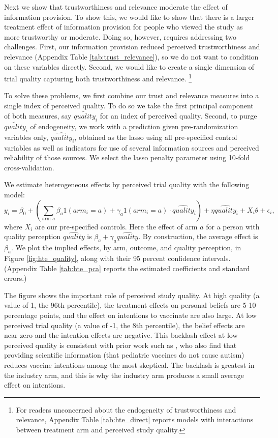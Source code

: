 Next we show that trustworthiness and relevance moderate the effect of information provision. To show this, we would like to show that there is a larger treatment effect of information provision for people who viewed the study as more trustworthy or moderate. Doing so, however, requires addressing two challenges. First, our information provision reduced perceived trustworthiness and relevance (Appendix Table \ref{tab:trust_relevance}), so we do not want to condition on these variables directly. Second, we would like to create a single dimension of trial quality capturing both trustworthiness and relevance.%
\footnote{For readers unconcerned about the endogeneity of trustworthiness and relevance, Appendix Table \ref{tab:hte_direct} reports models with interactions between treatment arm and perceived study quality.}

To solve these problems, we first combine our trust and relevance measures into a single index of perceived quality. To do so we take the first principal component of both measures, say
$\widetilde{quality}_i$ for an index of perceived quality. Second, to purge 
$\widetilde{quality}_i$ of endogeneity, we work with a prediction given pre-randomization
variables only, $\widehat{quality}_i$, obtained as the lasso using all pre-specified
control variables as well as indicators for use of several information sources and
perceived reliability of those sources. We select the lasso penalty parameter using 
10-fold cross-validation. 

We estimate heterogeneous effects by perceived trial quality with the following model:
\begin{equation} \label{eq:hte_quality}
  y_i = \beta_0 + \left(
    \sum_{\text{arm } a} \beta_a 1(arm_i=a) + \gamma_a 1(arm_i=a)\cdot \widehat{quality}_i
    \right)
  + \eta \widehat{quality}_i +X_i\theta + \epsilon_i,
\end{equation}
where $X_i$ are our pre-specified controls. Here the effect of arm $a$ for a person
with quality perception $\widehat{quality}$ is $\beta_a + \gamma_a \widehat{quality}$. By
construction, the average effect is $\beta_a$. We plot the implied effects, by arm, outcome, and quality perception, in Figure 
\ref{fig:hte_quality}, 
along with their 95 percent confidence intervals. (Appendix Table \ref{tab:hte_pca} reports
the estimated coefficients and standard errors.) 

The figure shows the important role of perceived study quality.  At high quality (a value of 1,  the 96th percentile), the treatment effects on personal beliefs are 5-10 percentage points, and the effect on intentions to vaccinate are also large. At low perceived trial quality (a value of -1, the 8th percentile), the belief 
effects are near zero and the intention effects are negative. This backlash effect
at low perceived quality is consistent with prior work such as \citet{nyhan2014effective},
who also find that providing scientific information (that pediatric vaccines do not cause
autism) reduces vaccine intentions among the most skeptical. The backlash is greatest 
in the industry arm, and this is why the industry arm produces a small average effect on  intentions. 


